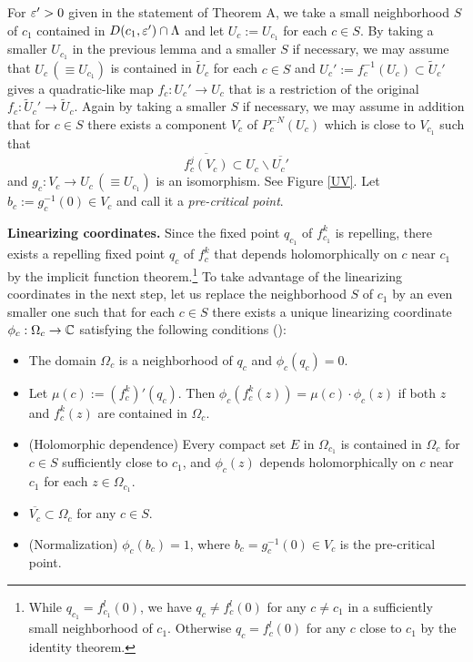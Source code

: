 For $ \varepsilon'>0$ given in the statement of Theorem A,
we take a small neighborhood $S$ of $c_1$ contained in 
$D(c_1, \varepsilon') \cap \Lambda$ and 
let $U_c := U_{c_1}$ for each $c \in S$.
By taking a smaller $U_{c_1}$ 
in the previous lemma
and a smaller $S$ if necessary,
we may assume that 
$U_c \,(\equiv U_{c_1})$ is contained in 
$\widetilde{U}_{c}$ 
for each $c \in S$ and 
$U_c':=f_c^{-1}(U_c) \subset \widetilde{U}_{c}'$ 
gives a quadratic-like map $f_c:U_c' \to U_c$
that is a restriction of the original $f_c: \widetilde{U}_{c}' \to \widetilde{U}_{c}$.
Again by taking a smaller $S$ if necessary, 
we may assume in addition that 
for $c \in S$ there exists a component $V_c$
of $P_c^{-N}(U_c)$ which is close to $V_{c_1}$ such that
$$
  \overline{f_c^j(V_c)} \subset U_c \smallsetminus \overline{U_c'}
$$
and $g_c : V_c \to U_c \,(\equiv U_{c_1})$ is an isomorphism. 
See 
Figure \ref{UV}. Let $b_c := g_c^{-1}(0) \in V_c$ and call it
a {\it pre-critical point}. 

\noindent
{\bf Linearizing coordinates.}
Since the fixed point $q_{c_1}$ of $f_{c_1}^k$ is repelling, 
there exists a repelling fixed point $q_c$ of $f_c^k$
that depends holomorphically on $c$ near $c_1$
by the implicit function theorem.\footnote{
While $q_{c_1} = f_{c_1}^l(0)$, 
we have $q_c \ne f_c^l(0)$ for any $c \ne c_1$ 
in a sufficiently small neighborhood of $c_1$. 
Otherwise $q_c = f_c^l(0)$ for any $c$ close to $c_1$ by the identity
theorem.}
To take advantage of the linearizing coordinates
in the next step, 
let us replace the neighborhood $S$ of $c_1$
by an even smaller one such that for each $c \in S$ there exists a unique linearizing coordinate 
$\phi_c : \Omega_c \to \mathbb C$ satisfying the following conditions (\cite[\S 8]{Milnor 2006}):
\begin{itemize}
\item
The domain $\Omega_c$ is a neighborhood of $q_c$
and $\phi_c(q_c) = 0$.
\item
Let $\mu(c) := (f_c^k)'(q_c)$. Then
$
  \phi_c(f_c^k(z)) = \mu(c) \cdot \phi_c(z)
$
if both $z$ and $f_c^{k}(z)$ are contained in $\Omega_c$.
\item
(Holomorphic dependence) 
Every compact set $E$ in $\Omega_{c_1}$ 
is contained in $\Omega_c$ for $c \in S$ sufficiently close to $c_1$,
and $\phi_c(z)$ depends holomorphically on $c$ near $c_1$ for each $z \in \Omega_{c_1}$.
\item
$\overline{V_c} \subset \Omega_c$ for any $c \in S$. 
\item
(Normalization) 
$\phi_c(b_c)=1$, where $b_c=g_c^{-1}(0) \in V_c$ is the pre-critical point.
\end{itemize}




